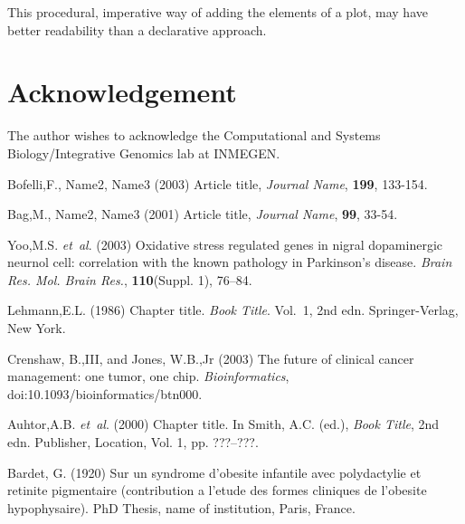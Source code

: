 \documentclass{bioinfo}
\begin{document}
This procedural, imperative way of adding the elements of a plot, may
have better readability than a declarative approach.



\section*{Acknowledgement}
The author wishes to acknowledge the Computational and Systems
Biology/Integrative Genomics lab at INMEGEN.


%
%
%
%

%
%
%
%


\begin{thebibliography}{}
 Bofelli,F., Name2, Name3 (2003) Article title, {\it Journal Name}, {\bf 199}, 133-154.

 Bag,M., Name2, Name3 (2001) Article title, {\it Journal Name}, {\bf 99}, 33-54.

Yoo,M.S. \textit{et~al}. (2003) Oxidative stress regulated genes
in nigral dopaminergic neurnol cell: correlation with the known
pathology in Parkinson's disease. \textit{Brain Res. Mol. Brain
Res.}, \textbf{110}(Suppl. 1), 76--84.

Lehmann,E.L. (1986) Chapter title. \textit{Book Title}. Vol.~1, 2nd edn. Springer-Verlag, New York.

Crenshaw, B.,III, and Jones, W.B.,Jr (2003) The future of clinical
cancer management: one tumor, one chip. \textit{Bioinformatics},
doi:10.1093/bioinformatics/btn000.

Auhtor,A.B. \textit{et~al}. (2000) Chapter title. In Smith, A.C.
(ed.), \textit{Book Title}, 2nd edn. Publisher, Location, Vol. 1, pp.
???--???.

Bardet, G. (1920) Sur un syndrome d'obesite infantile avec
polydactylie et retinite pigmentaire (contribution a l'etude des
formes cliniques de l'obesite hypophysaire). PhD Thesis, name of
institution, Paris, France.

\end{thebibliography}
\end{document}
